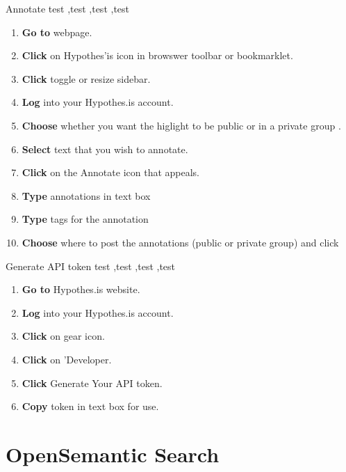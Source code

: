\documentclass[10pt,a4paper]{article}
\begin{document}
\begin{textbox}{Annotate}
test  \sep test \sep test \sep test

\bigskip

\begin{enumerate}
\item \textbf{Go to} webpage. 
\item \textbf{Click} on Hypothes'is icon in browswer toolbar or bookmarklet.
\item \textbf{Click} toggle or resize sidebar.
\item \textbf{Log} into your Hypothes.is account.
\item \textbf{Choose} whether you want the higlight to be public or in a private group .
\item \textbf{Select} text that you wish to annotate.
\item \textbf{Click} on the Annotate icon that appeals.
\item \textbf{Type} annotations in text box
\item \textbf{Type} tags for the annotation
\item \textbf{Choose} where to post the annotations (public or private group) and click 

\end{enumerate}

\end{textbox}


\begin{textbox}{Generate API token}
test  \sep test \sep test \sep test

\bigskip

\begin{enumerate}
\item \textbf{Go to} Hypothes.is website. 
\item \textbf{Log} into your Hypothes.is account.
\item \textbf{Click} on gear icon.
\item \textbf{Click} on 'Developer.
\item \textbf{Click} Generate Your API token.
\item \textbf{Copy} token in text box for use.

\end{enumerate}

\end{textbox}


\section{OpenSemantic Search}
\end{document}
